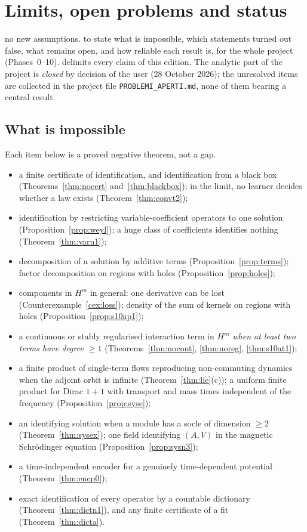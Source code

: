 \chapter{Limits, open problems and status}\label{ch:status}
\chapterbrief
{no new assumptions.}
{to state what is impossible, which statements turned out false, what remains open, and how reliable each result is, for the whole project (Phases~0--10).}
{delimits every claim of this edition. The analytic part of the project is \emph{closed} by decision of the user (28 October 2026); the unresolved items are collected in the project file \texttt{PROBLEMI\_APERTI.md}, none of them bearing a central result.}

\section{What is impossible}

Each item below is a proved negative theorem, not a gap.
\begin{itemize}
\item a finite certificate of identification, and identification from a black box (Theorems~\ref{thm:nocert} and~\ref{thm:blackbox}); in the limit, no learner decides whether a law exists (Theorem~\ref{thm:convt2});
\item identification by restricting variable-coefficient operators to one solution (Proposition~\ref{prop:weyl}); a huge class of coefficients identifies nothing (Theorem~\ref{thm:varn1});
\item decomposition of a solution by additive terms (Proposition~\ref{prop:terms}); factor decomposition on regions with holes (Proposition~\ref{prop:holes});
\item components in $H^m$ in general: one derivative can be lost (Counterexample~\ref{cex:loss}); density of the sum of kernels on regions with holes (Proposition~\ref{prop:s10ap1});
\item a continuous or stably regularised interaction term in $H^m$ \emph{when at least two terms have degree $\ge1$} (Theorems~\ref{thm:nocont}, \ref{thm:noreg}, \ref{thm:s10at1});
\item a finite product of single-term flows reproducing non-commuting dynamics when the adjoint orbit is infinite (Theorem~\ref{thm:lie}(c)); a uniform finite product for Dirac $1+1$ with transport and mass times independent of the frequency (Proposition~\ref{prop:syse});
\item an identifying solution when a module has a socle of dimension $\ge2$ (Theorem~\ref{thm:sysex}); one field identifying $(A,V)$ in the magnetic Schr\"odinger equation (Proposition~\ref{prop:sysn3});
\item a time-independent encoder for a genuinely time-dependent potential (Theorem~\ref{thm:encp0});
\item exact identification of every operator by a countable dictionary (Theorem~\ref{thm:dictn1}), and any finite certificate of a fit (Theorem~\ref{thm:dicta}).
\end{itemize}

